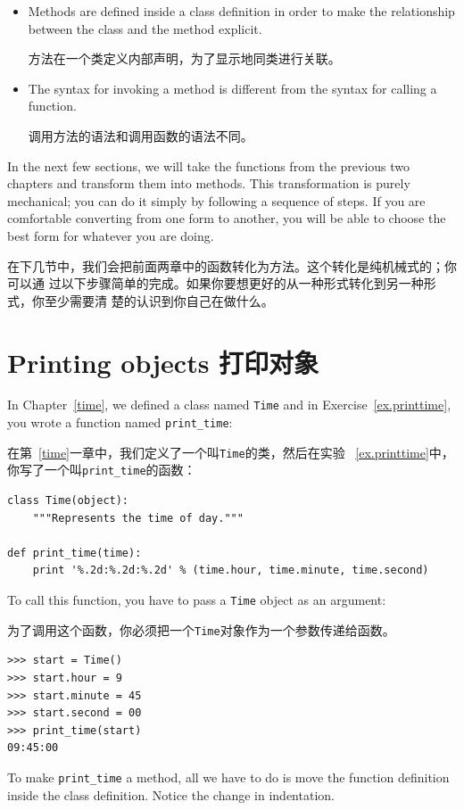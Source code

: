 \documentclass[10pt]{book}
\begin{document}
\begin{CJK}{UTF8}{gbsn}
\begin{itemize}
\item Methods are defined inside a class definition in order
to make the relationship between the class and the method explicit.

方法在一个类定义内部声明，为了显示地同类进行关联。

\item The syntax for invoking a method is different from the
syntax for calling a function.

调用方法的语法和调用函数的语法不同。

\end{itemize}

In the next few sections, we will take the functions from the previous
two chapters and transform them into methods.  This transformation is
purely mechanical; you can do it simply by following a sequence of
steps.  If you are comfortable converting from one form to another,
you will be able to choose the best form for whatever you are doing.

在下几节中，我们会把前面两章中的函数转化为方法。这个转化是纯机械式的；你可以通
过以下步骤简单的完成。如果你要想更好的从一种形式转化到另一种形式，你至少需要清
楚的认识到你自己在做什么。


\section{Printing objects 打印对象}

In Chapter~\ref{time}, we defined a class named
{\tt Time} and in Exercise~\ref{ex.printtime}, you 
wrote a function named \verb"print_time":

在第~\ref{time}一章中，我们定义了一个叫{\tt Time}的类，然后在实验
~\ref{ex.printtime}中，你写了一个叫\verb"print_time"的函数：

\begin{verbatim}
class Time(object):
    """Represents the time of day."""

def print_time(time):
    print '%.2d:%.2d:%.2d' % (time.hour, time.minute, time.second)
\end{verbatim}
%
To call this function, you have to pass a {\tt Time} object as an
argument:

为了调用这个函数，你必须把一个{\tt Time}对象作为一个参数传递给函数。

\begin{verbatim}
>>> start = Time()
>>> start.hour = 9
>>> start.minute = 45
>>> start.second = 00
>>> print_time(start)
09:45:00
\end{verbatim}
%
To make \verb"print_time" a method, all we have to do is
move the function definition inside the class definition.  Notice
the change in indentation.


\end{CJK}
\end{document}
